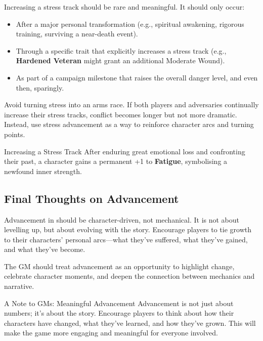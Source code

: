 Increasing a stress track should be rare and meaningful. It should only occur:
\begin{itemize}
    \item After a major personal transformation (e.g., spiritual awakening, rigorous training, surviving a near-death event).
    \item Through a specific trait that explicitly increases a stress track (e.g., \textbf{Hardened Veteran} might grant an additional Moderate Wound).
    \item As part of a campaign milestone that raises the overall danger level, and even then, sparingly.
\end{itemize}

Avoid turning stress into an arms race. If both players and adversaries continually increase their stress tracks, conflict becomes longer but not more dramatic. Instead, use stress advancement as a way to reinforce character arcs and turning points.

\begin{Example}{Increasing a Stress Track}
    After enduring great emotional loss and confronting their past, a character gains a permanent +1 to \textbf{Fatigue}, symbolising a newfound inner strength.
\end{Example}

\subsection{Final Thoughts on Advancement}
Advancement in \wyrd should be character-driven, not mechanical. It is not about levelling up, but about evolving with the story. Encourage players to tie growth to their characters’ personal arcs—what they’ve suffered, what they’ve gained, and what they’ve become.

The GM should treat advancement as an opportunity to highlight change, celebrate character moments, and deepen the connection between mechanics and narrative.

\begin{CommentBox}{A Note to GMs: Meaningful Advancement}
    Advancement is not just about numbers; it’s about the story. Encourage players to think about how their characters have changed, what they’ve learned, and how they’ve grown. This will make the game more engaging and meaningful for everyone involved.
\end{CommentBox}
